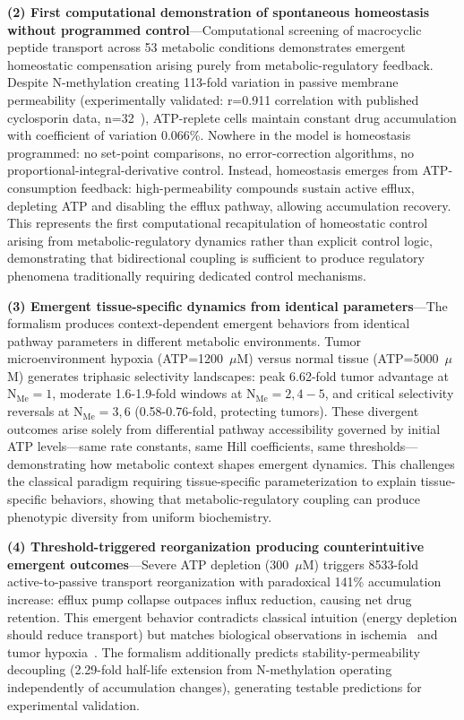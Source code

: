 \documentclass[10pt,letterpaper]{article}
\begin{document}
\textbf{(2) First computational demonstration of spontaneous homeostasis without programmed control}---Computational screening of macrocyclic peptide transport across 53 metabolic conditions demonstrates emergent homeostatic compensation arising purely from metabolic-regulatory feedback. Despite N-methylation creating 113-fold variation in passive membrane permeability (experimentally validated: r=0.911 correlation with published cyclosporin data, n=32~\cite{Doak2014}), ATP-replete cells maintain constant drug accumulation with coefficient of variation 0.066\%. Nowhere in the model is homeostasis programmed: no set-point comparisons, no error-correction algorithms, no proportional-integral-derivative control. Instead, homeostasis emerges from ATP-consumption feedback: high-permeability compounds sustain active efflux, depleting ATP and disabling the efflux pathway, allowing accumulation recovery. This represents the first computational recapitulation of homeostatic control arising from metabolic-regulatory dynamics rather than explicit control logic, demonstrating that bidirectional coupling is sufficient to produce regulatory phenomena traditionally requiring dedicated control mechanisms.

\textbf{(3) Emergent tissue-specific dynamics from identical parameters}---The formalism produces context-dependent emergent behaviors from identical pathway parameters in different metabolic environments. Tumor microenvironment hypoxia (ATP=1200~$\mu$M) versus normal tissue (ATP=5000~$\mu$M) generates triphasic selectivity landscapes: peak 6.62-fold tumor advantage at N$_{\text{Me}}=1$, moderate 1.6-1.9-fold windows at N$_{\text{Me}}=2,4-5$, and critical selectivity reversals at N$_{\text{Me}}=3,6$ (0.58-0.76-fold, protecting tumors). These divergent outcomes arise solely from differential pathway accessibility governed by initial ATP levels—same rate constants, same Hill coefficients, same thresholds—demonstrating how metabolic context shapes emergent dynamics. This challenges the classical paradigm requiring tissue-specific parameterization to explain tissue-specific behaviors, showing that metabolic-regulatory coupling can produce phenotypic diversity from uniform biochemistry.

\textbf{(4) Threshold-triggered reorganization producing counterintuitive emergent outcomes}---Severe ATP depletion (300~$\mu$M) triggers 8533-fold active-to-passive transport reorganization with paradoxical 141\% accumulation increase: efflux pump collapse outpaces influx reduction, causing net drug retention. This emergent behavior contradicts classical intuition (energy depletion should reduce transport) but matches biological observations in ischemia~\cite{Lipton1999} and tumor hypoxia~\cite{Vaupel1989}. The formalism additionally predicts stability-permeability decoupling (2.29-fold half-life extension from N-methylation operating independently of accumulation changes), generating testable predictions for experimental validation.
\end{document}
